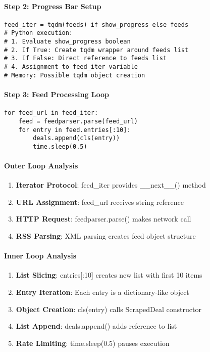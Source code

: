 \paragraph{Step 2: Progress Bar Setup}
\begin{lstlisting}[caption=Conditional Progress Bar]
feed_iter = tqdm(feeds) if show_progress else feeds
# Python execution:
# 1. Evaluate show_progress boolean
# 2. If True: Create tqdm wrapper around feeds list
# 3. If False: Direct reference to feeds list
# 4. Assignment to feed_iter variable
# Memory: Possible tqdm object creation
\end{lstlisting}

\paragraph{Step 3: Feed Processing Loop}
\begin{lstlisting}[caption=RSS Feed Iteration]
for feed_url in feed_iter:
    feed = feedparser.parse(feed_url)
    for entry in feed.entries[:10]:
        deals.append(cls(entry))
        time.sleep(0.5)
\end{lstlisting}

\paragraph{Outer Loop Analysis}
\begin{enumerate}
\item \textbf{Iterator Protocol}: feed\_iter provides \_\_next\_\_() method
\item \textbf{URL Assignment}: feed\_url receives string reference
\item \textbf{HTTP Request}: feedparser.parse() makes network call
\item \textbf{RSS Parsing}: XML parsing creates feed object structure
\end{enumerate}

\paragraph{Inner Loop Analysis}
\begin{enumerate}
\item \textbf{List Slicing}: entries[:10] creates new list with first 10 items
\item \textbf{Entry Iteration}: Each entry is a dictionary-like object
\item \textbf{Object Creation}: cls(entry) calls ScrapedDeal constructor
\item \textbf{List Append}: deals.append() adds reference to list
\item \textbf{Rate Limiting}: time.sleep(0.5) pauses execution
\end{enumerate}

